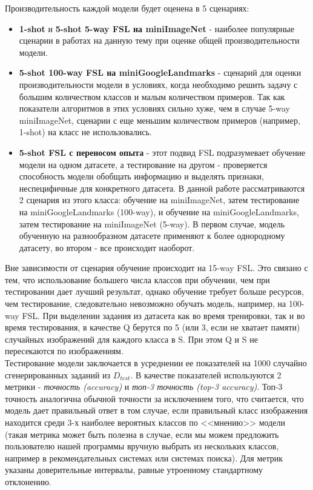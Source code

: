\documentclass[a4paper, 12pt]{report}
\begin{document}
Производительность каждой модели будет оценена в 5 сценариях:
\begin{itemize}
\item \textbf{1-shot} и \textbf{5-shot 5-way FSL на miniImageNet} - наиболее популярные сценарии в работах на данную тему при оценке общей производительности модели.

\item \textbf{5-shot 100-way FSL на miniGoogleLandmarks} - сценарий для оценки производительности модели в условиях, когда необходимо решить задачу с большим количеством классов и малым количеством примеров. Так как показатели алгоритмов в этих условиях сильно хуже, чем в случае 5-way miniImageNet, сценарии с еще меньшим количеством примеров (например, 1-shot) на класс не использовались.

\item \textbf{5-shot FSL с переносом опыта} - этот подвид FSL подразумевает обучение модели на одном датасете, а тестирование на другом - проверяется способность модели обобщать информацию и выделять признаки, неспецифичные для конкретного датасета. В данной работе рассматриваются 2 сценария из этого класса: обучение на miniImageNet, затем тестирование на miniGoogleLandmarks (100-way), и обучение на miniGoogleLandmarks, затем тестирование на miniImageNet (5-way). В первом случае, модель обученную на разнообразном датасете применяют к более однородному датасету, во втором - все происходит наоборот.

\end{itemize}

Вне зависимости от сценария обучение происходит на 15-way FSL. Это связано с тем, что использование большего числа классов при обучении, чем при тестировании дает лучший результат, однако обучение требует больше ресурсов, чем тестирование, следовательно невозможно обучать модель, например, на 100-way FSL. При выделении задания из датасета как во время тренировки, так и во время тестирования, в качестве Q берутся по 5 (или 3, если не хватает памяти) случайных изображений для каждого класса в S. При этом Q и S не пересекаются по изображениям. \\

Тестирование модели заключается в усреднении ее показателей на 1000 случайно сгенерированных заданий из $D_{test}$. В качестве показателей используются 2 метрики - \textit{точность (accuracy)} и \textit{топ-3 точность (top-3 accuracy)}. Топ-3 точность аналогична обычной точности за исключением того, что считается, что модель дает правильный ответ в том случае, если правильный класс изображения находится среди 3-х наиболее вероятных классов по <<мнению>> модели (такая метрика может быть полезна в случае, если мы можем предложить пользователю нашей программы вручную выбрать из нескольких классов, например в рекомендательных системах или системах поиска). Для метрик указаны доверительные интервалы, равные утроенному стандартному отклонению. \\
\end{document}
